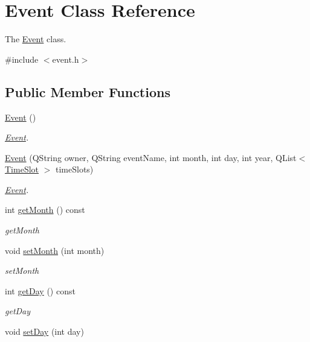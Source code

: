\hypertarget{class_event}{}\section{Event Class Reference}
\label{class_event}


The \hyperlink{class_event}{Event} class.  




{\ttfamily \#include $<$event.\+h$>$}

\subsection*{Public Member Functions}
\begin{DoxyCompactItemize}
\item 
\hyperlink{class_event_a5a40dd4708297f7031e29b39e039ae10}{Event} ()
\begin{DoxyCompactList}\small\item\em \hyperlink{class_event}{Event}. \end{DoxyCompactList}\item 
\hyperlink{class_event_a28e7aab4f7a4f7bd375a63be18b5c44c}{Event} (Q\+String owner, Q\+String event\+Name, int month, int day, int year, Q\+List$<$ \hyperlink{class_time_slot}{Time\+Slot} $>$ time\+Slots)
\begin{DoxyCompactList}\small\item\em \hyperlink{class_event}{Event}. \end{DoxyCompactList}\item 
int \hyperlink{class_event_a29caad464e4a7cf6aa29973ed9345f6d}{get\+Month} () const
\begin{DoxyCompactList}\small\item\em get\+Month \end{DoxyCompactList}\item 
void \hyperlink{class_event_acd9e57cf462362474a5734874c5267e4}{set\+Month} (int month)
\begin{DoxyCompactList}\small\item\em set\+Month \end{DoxyCompactList}\item 
int \hyperlink{class_event_a710a15a86ca734cbd84e77e8d2ed216c}{get\+Day} () const
\begin{DoxyCompactList}\small\item\em get\+Day \end{DoxyCompactList}\item 
void \hyperlink{class_event_a94940b483087e30b440ff2579b285d9c}{set\+Day} (int day)

\end{DoxyCompactItemize}
